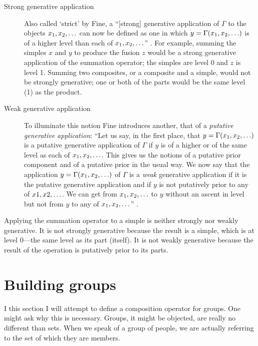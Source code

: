 \documentclass[11pt]{article}
\begin{document}
\begin{spacing}{1.25}
\begin{description}
  \item[Strong generative application] Also called `strict' by Fine, a
    ``[strong] generative application of $\Gamma$ to the objects $x_1,
    x_2, \mathellipsis$ can now be defined as one in which $y = \Gamma
    (x_1, x_2, \mathellipsis )$ is of a higher level than each of
    $x_1, x_2, \mathellipsis$'' \citeyearpar[584]{fine2010}.  For
    example, summing the simples $x$ and $y$ to produce the fusion $z$
    would be a strong generative application of the summation
    operator; the simples are level 0 and $z$ is level 1.  Summing two
    composites, or a composite and a simple, would not be strongly
    generative; one or both of the parts would be the same level (1)
    as the product.
  \item[Weak generative application] To illuminate this notion Fine
    introduces another, that of a {\em putative generative
      application}: ``Let us say, in the first place, that $y = \Gamma
    (x_1, x_2, \mathellipsis )$ is a putative generative application
    of $\Gamma$ if $y$ is of a higher or of the same level as each of
    $x_1, x_2, \mathellipsis$.  This gives us the notions of a
    putative prior component and of a putative prior in the usual way.
    We now say that the application $y = \Gamma (x_1, x_2,
    \mathellipsis )$ of $\Gamma$ is a {\em weak} generative
    application if it is the putative generative application and if
    $y$ is not putatively prior to any of $x1, x2, \mathellipsis$.  We
    can get from $x_1, x_2, \mathellipsis$ to $y$ without an ascent in
    level but not from $y$ to any of $x_1, x_2, \mathellipsis$''
    \citeyearpar[584]{fine2010}.
\end{description}

Applying the summation operator to a simple is neither strongly nor
weakly generative.  It is not strongly generative because the result
is a simple, which is at level 0---the same level as its part
(itself).  It is not weakly generative because the result of the
operation is putatively prior to its parts.

\section{Building groups}
\label{group}

I this section I will attempt to define a composition operator for
groups.  One might ask why this is necessary.  Groups, it might be
objected, are really no different than sets.  When we speak of a group
of people, we are actually referring to the set of which they are
members.


\end{spacing}
\end{document}
